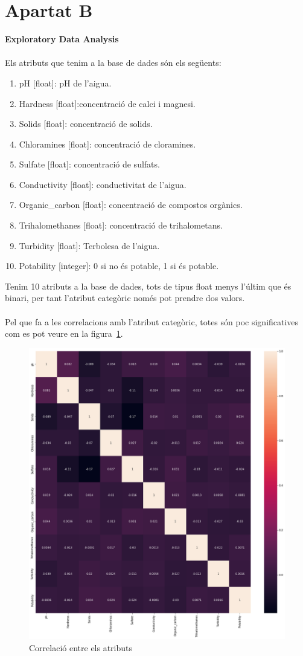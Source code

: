 \documentclass{article}
\begin{document}
	\section*{Apartat B}
	\textbf{Exploratory Data Analysis}\\
	\\
	Els atributs que tenim a la base de dades són els següents:
	\begin{enumerate}
		\addtocounter{enumi}{-1}
		\item pH [float]: pH de l'aigua.
		\item Hardness [float]:concentració de calci i magnesi.
		\item Solids [float]: concentració de solids.
		\item Chloramines [float]: concentració de cloramines. 
		\item Sulfate [float]: concentració de sulfats.
		\item Conductivity [float]: conductivitat de l'aigua.
		\item Organic\_carbon [float]: concentració de compostos orgànics.
		\item Trihalomethanes [float]: concentració de trihalometans.
		\item Turbidity [float]: Terbolesa de l'aigua.
		\item Potability [integer]: 0 si no és potable, 1 si és potable.
	\end{enumerate}
	Tenim 10 atributs a la base de dades, tots de tipus float menys l'últim que és binari, per tant l'atribut categòric només pot prendre dos valors.\\
	\\
	Pel que fa a les correlacions amb l'atribut categòric, totes són poc significatives com es pot veure en la figura~\ref{fig:correlacions}.\\
	\begin{figure}[!h]
		\centering
		\includegraphics[width=0.4\linewidth]{../images/correlacions}
		\caption{Correlació entre els atributs}
		\label{fig:correlacions}
	\end{figure}\\
\end{document}
